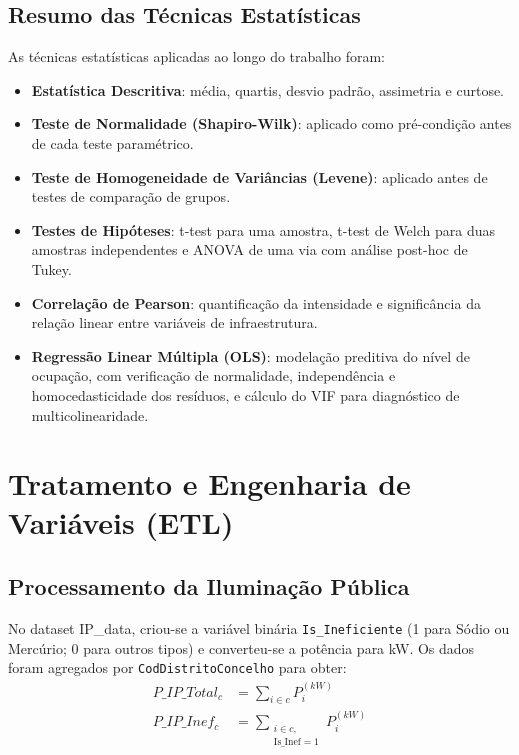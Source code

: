 \documentclass[conference]{IEEEtran}
\begin{document}
\subsection{Resumo das Técnicas Estatísticas}

As técnicas estatísticas aplicadas ao longo do trabalho foram:
\begin{itemize}
    \item \textbf{Estatística Descritiva}: média, quartis, desvio padrão, assimetria e curtose.
    \item \textbf{Teste de Normalidade (Shapiro-Wilk)}: aplicado como pré-condição antes de cada teste paramétrico.
    \item \textbf{Teste de Homogeneidade de Variâncias (Levene)}: aplicado antes de testes de comparação de grupos.
    \item \textbf{Testes de Hipóteses}: t-test para uma amostra, t-test de Welch para duas amostras independentes e ANOVA de uma via com análise post-hoc de Tukey.
    \item \textbf{Correlação de Pearson}: quantificação da intensidade e significância da relação linear entre variáveis de infraestrutura.
    \item \textbf{Regressão Linear Múltipla (OLS)}: modelação preditiva do nível de ocupação, com verificação de normalidade, independência e homocedasticidade dos resíduos, e cálculo do VIF para diagnóstico de multicolinearidade.
\end{itemize}


\section{Tratamento e Engenharia de Variáveis (ETL)}
\subsection{Processamento da Iluminação Pública}

No dataset IP\_data, criou-se a variável binária \texttt{Is\_Ineficiente} (1 para Sódio ou Mercúrio; 0 para outros tipos) e converteu-se a potência para kW. Os dados foram agregados por \texttt{CodDistritoConcelho} para obter:
\begin{align}
P\_IP\_Total_c &= \textstyle\sum_{i \in c} P_i^{(kW)} \\
P\_IP\_Inef_c &= \textstyle\sum_{\substack{i \in c,\\ \text{Is\_Inef}=1}} P_i^{(kW)}
\end{align}
\end{document}
